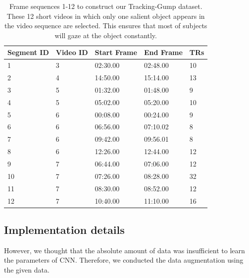 \documentclass[journal]{IEEEtran}
\begin{document}
\begin{table}[h]
	\centering
	\footnotesize
	\caption{Frame sequences 1-12 to construct our Tracking-Gump dataset.
		These 12 short videos in which only one salient object appears in the video sequence are selected. 
		This ensures that most of subjects will gaze at the object constantly.}
	
	\label{tab:track_seg}
	
	\begin{tabular}{p{1.0cm}<{\centering}p{0.9cm}<{\centering}p{1.6cm}<{\centering}p{1.5cm}<{\centering}p{0.7cm}<{\centering}}
		\toprule[1.5pt]
		Segment ID & Video ID  & Start Frame    & End Frame  & TRs   \\ \midrule[1pt]
		1     		  & 3 			   & 02:30.00 	   & 02:48.00  & 10  		  \\
		2  	 		  & 4 			   & 14:50.00 	   & 15:14.00  & 13   		  \\
		3   		  & 5 			   & 01:32.00 	   & 01:48.00  & 9   		  \\
		4   		  & 5 			   & 05:02.00  	   & 05:20.00  & 10   		  \\
		5   		  & 6 			   & 00:08.00 	   & 00:24.00  & 9   		  \\
		6   		  & 6 			   & 06:56.00 	   & 07:10.02  & 8   		  \\
		7   		  & 6 			   & 09:42.00  	   & 09:56.01  & 8   		  \\
		8   		  & 6 			   & 12:26.00 	   & 12:44.00  & 12		      \\
		9   		  & 7  			   & 06:44.00 	   & 07:06.00  & 12		      \\
		10  		  & 7 			   & 07:26.00 	   & 08:28.00  & 32		      \\
		11  		  & 7 			   & 08:30.00 	   & 08:52.00  & 12		      \\
		12 			  & 7 			   & 10:40.00 	   & 11:10.00  & 16		      \\
		\bottomrule[1.5pt]
	\end{tabular}
	
\end{table}



\subsection{Implementation details}
However, we thought that the absolute amount of data was insufficient to learn the parameters of CNN.
Therefore, we conducted the data augmentation using the given data.
\end{document}

